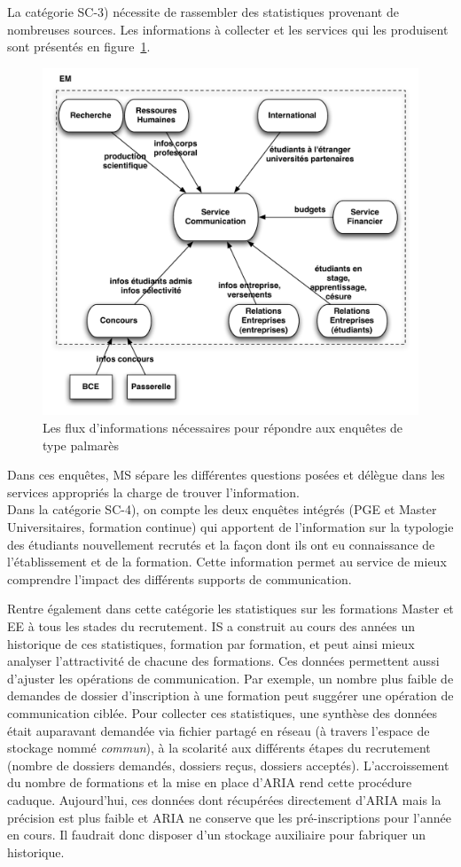 \documentclass{book}
\begin{document}
La catégorie SC-3) nécessite de rassembler des statistiques provenant de 
nombreuses sources. Les informations à collecter et les services qui les 
produisent sont présentés en figure~\ref{fg:comm_flux}.
\begin{figure}[hbt]
\begin{center}
\includegraphics[width=.75\linewidth]{figs/comm_flux.pdf}
\end{center}
\caption{Les flux d'informations nécessaires pour répondre aux enquêtes de 
type palmarès}
\label{fg:comm_flux}
\end{figure}
Dans ces enquêtes, MS sépare les différentes questions posées et délègue
dans les services appropriés la charge de trouver l'information.\\


Dans la catégorie SC-4), on compte les deux enquêtes intégrés (PGE et Master 
Universitaires, formation continue) qui apportent de l'information sur la 
typologie des étudiants nouvellement recrutés et la façon dont ils ont eu 
connaissance de l'établissement et de la formation. Cette information permet 
au service de mieux comprendre l'impact des différents supports de 
communication.

Rentre également dans cette catégorie les statistiques sur les formations
Master et EE à tous les stades du recrutement. IS a construit au cours 
des années un historique de ces statistiques, formation par formation,
et peut ainsi mieux analyser l'attractivité de chacune des formations.
Ces données permettent aussi d'ajuster les opérations de communication.
Par exemple, un nombre plus faible de demandes de dossier d'inscription 
à une formation peut suggérer une opération de communication ciblée.
Pour collecter ces statistiques, une synthèse des données était auparavant
demandée via fichier partagé en réseau (à travers l'espace de stockage nommé
\textit{commun}\index{\clecommun}), à la scolarité aux différents étapes 
du recrutement (nombre de dossiers demandés, dossiers reçus, dossiers acceptés). 
L'accroissement du nombre de formations et la mise en place d'ARIA rend 
cette procédure caduque. Aujourd'hui, ces données dont récupérées
directement d'ARIA mais la précision est plus faible et ARIA ne 
conserve que les pré-inscriptions pour l'année en cours. Il faudrait
donc disposer d'un stockage auxiliaire pour fabriquer un historique.
\end{document}
